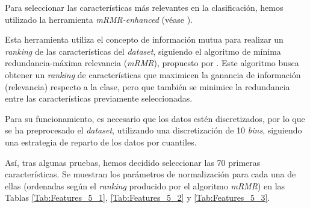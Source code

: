 \documentclass[12pt]{article}
\begin{document}
\bigskip
Para seleccionar las características más relevantes en la clasificación, hemos utilizado la herramienta \textit{mRMR-enhanced} (véase \cite{mRMR-enhanced}).

Esta herramienta utiliza el concepto de información mutua para realizar un \textit{ranking} de las características del \textit{dataset},
siguiendo el algoritmo de mínima redundancia-máxima relevancia (\textit{mRMR}), propuesto por \cite{peng2005mrmr}. Este algoritmo busca obtener un \textit{ranking}
de características que maximicen la ganancia de información (relevancia) respecto a la clase, pero que también se minimice
la redundancia entre las características previamente seleccionadas.

\bigskip
Para su funcionamiento, es necesario que los datos estén discretizados, por lo que se ha preprocesado el \textit{dataset}, utilizando
una discretización de 10 \textit{bins}, siguiendo una estrategia de reparto de los datos por cuantiles. 

\bigskip
Así, tras algunas pruebas, hemos decidido seleccionar las 70 primeras características. Se muestran los parámetros de normalización
para cada una de ellas (ordenadas según el \textit{ranking} producido por el algoritmo \textit{mRMR}) en las Tablas \ref{Tab:Features_5_1}, \ref{Tab:Features_5_2} y \ref{Tab:Features_5_3}.
\end{document}
